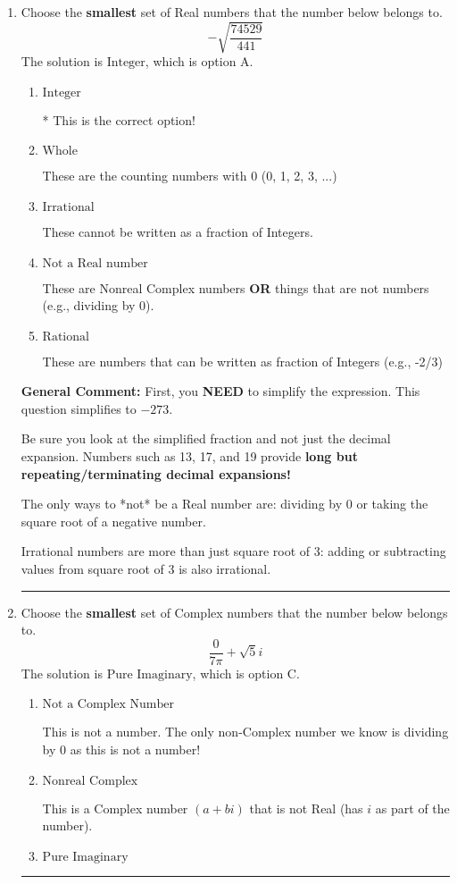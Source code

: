 \documentclass{extbook}[14pt]
\newcommand{\litem}[1]{\item #1

\rule{\textwidth}{0.4pt}}
\begin{document}
\begin{enumerate}
{ Irrational numbers are more than just square root of 3: adding or subtracting values from square root of 3 is also irrational.
}
\litem{
Choose the \textbf{smallest} set of Real numbers that the number below belongs to.
\[ -\sqrt{\frac{74529}{441}} \]The solution is \( \text{Integer} \), which is option A.\begin{enumerate}[label=\Alph*.]
\item \( \text{Integer} \)

* This is the correct option!
\item \( \text{Whole} \)

These are the counting numbers with 0 (0, 1, 2, 3, ...)
\item \( \text{Irrational} \)

These cannot be written as a fraction of Integers.
\item \( \text{Not a Real number} \)

These are Nonreal Complex numbers \textbf{OR} things that are not numbers (e.g., dividing by 0).
\item \( \text{Rational} \)

These are numbers that can be written as fraction of Integers (e.g., -2/3)
\end{enumerate}

\textbf{General Comment:} First, you \textbf{NEED} to simplify the expression. This question simplifies to $-273$. 
 
 Be sure you look at the simplified fraction and not just the decimal expansion. Numbers such as 13, 17, and 19 provide \textbf{long but repeating/terminating decimal expansions!} 
 
 The only ways to *not* be a Real number are: dividing by 0 or taking the square root of a negative number. 
 
 Irrational numbers are more than just square root of 3: adding or subtracting values from square root of 3 is also irrational.
}
\litem{
Choose the \textbf{smallest} set of Complex numbers that the number below belongs to.
\[ \frac{0}{7 \pi}+\sqrt{5}i \]The solution is \( \text{Pure Imaginary} \), which is option C.\begin{enumerate}[label=\Alph*.]
\item \( \text{Not a Complex Number} \)

This is not a number. The only non-Complex number we know is dividing by 0 as this is not a number!
\item \( \text{Nonreal Complex} \)

This is a Complex number $(a+bi)$ that is not Real (has $i$ as part of the number).
\item \( \text{Pure Imaginary} \)


\end{enumerate}}
\end{enumerate}
\end{document}
